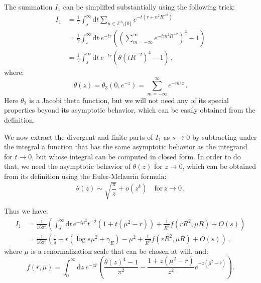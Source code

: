 \documentclass[11pt,a4paper]{article}
\newcommand{\dd}{\mathrm{d}}
\begin{document}
The summation $I_1$ can be simplified substantially using the following trick:
\begin{equation}
\begin{split}
    I_1 &= \frac{1}{V} \int_{s}^{\infty} \dd t \sum_{n\in\mathbb{Z}^4\setminus\{0\}} 
    e^{-t(r + n^2 R^{-2})}\\
    & = \frac{1}{V} \int_{s}^{\infty} \dd t\ e^{-t r}
        \left(\left(\sum_{m = -\infty}^{\infty} e^{-t m^2 R^{-2}}\right)^4 - 1\right) \\
    & = \frac{1}{V} \int_{s}^{\infty} \dd t\ e^{-t r}
        \left(\theta\!\left(t R^{-2}\right)^4 - 1\right)\,,
\end{split}
\end{equation}
where:
\begin{equation}
    \label{eq:theta}
    \theta(z) = \theta_3(0, e^{-z}) = \sum_{m = -\infty}^{\infty} e^{-m^2 z}\,.
\end{equation}
Here $\theta_3$ is a Jacobi theta function, but we will not need any of
its special properties beyond its asymptotic behavior, which can be easily
obtained from the definition.

We now extract the divergent and finite parts of $I_1$ as $s\to 0$ by
subtracting under the integral a function that has the same asymptotic behavior
as the integrand for $t \to 0$, but whose integral can be computed in closed
form. In order to do that, we need the asymptotic behavior of $\theta(z)$ for
$z\to0$, which can be obtained from its definition using the Euler-Mclaurin
formula:
\begin{equation}
    \theta(z) \sim \sqrt{\frac{\pi}{z}} + o(z^k) \quad\mathrm{for}\, z\to0\,.
\end{equation}

Thus we have:
\begin{equation}
\begin{split}
    I_1 &= \frac{1}{16\pi^2}\left(\int_{s}^{\infty}\dd t\, e^{-t \mu^2} t^{-2}\left(1 + t (\mu^2 - r)\right)
    +\frac{1}{R^2} f(r R^2, \mu R) + O(s)\right)\\
    &= \frac{1}{16\pi^2}\left(\frac{1}{s} + r\left(\log s\mu^2 + \gamma_{E}\right) - 
    \mu^2 +\frac{1}{R^2} f(r R^2, \mu R) + O(s)\right)\,,
\end{split}
\end{equation}
where $\mu$ is a renormalization scale that can be chosen at will, and:
\begin{equation}
    \label{eq:f_definition}
    f(\bar{r},\bar{\mu}) = \int_{0}^{\infty} \dd z\ e^{-z \bar{r}} \left(\frac{\theta(z)^4 - 1}{\pi^2} - 
    \frac{1 + z\left(\bar{\mu}^2 - \bar{r}\right)}{z^2}e^{-z\left(\bar{\mu}^2 - \bar{r}\right)}\right).
\end{equation}
\end{document}
